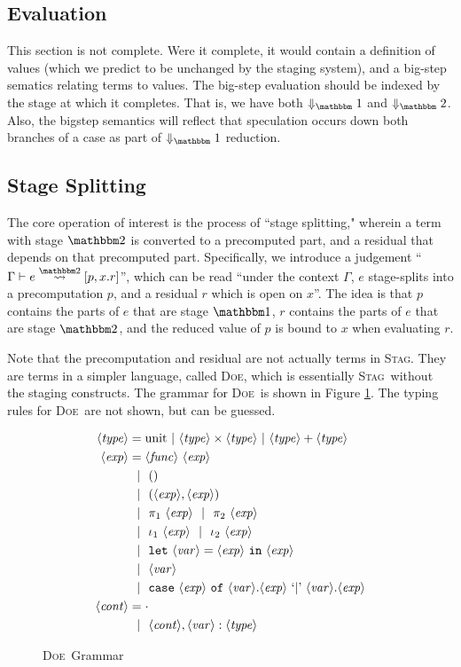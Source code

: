 \documentclass[11pt]{article}
\newcommand {\type} {\langle\mathit{type}\rangle}
\newcommand {\expr} {\langle\mathit{exp}\rangle}
\newcommand {\var} {\langle\mathit{var}\rangle}
\newcommand {\context} {\langle\mathit{cont}\rangle}
\newcommand {\gbar} {~~|~~}
\newcommand {\bbone} {\mathbbm 1}
\newcommand {\bbtwo} {\mathbbm 2}
\newcommand {\letin} [3] {{\tt let}~{#1} = {#2}~{\tt in}~{#3}}
\newcommand {\splits} {\overset{\bbtwo}\rightsquigarrow}
\newcommand {\wstage} {\textsc{Stag}}
\newcommand {\wostage} {\textsc{Doe}}
\begin{document}
\subsection{Evaluation}
This section is not complete.  Were it complete, it would contain a definition of values (which we predict to be unchanged by the staging system), and a big-step sematics relating terms to values.  The big-step evaluation should be indexed by the stage at which it completes.  That is, we have both $\Downarrow_\bbone$ and $\Downarrow_\bbtwo$.  Also, the bigstep semantics will reflect that speculation occurs down both branches of a case as part of  $\Downarrow_\bbone$ reduction.

\subsection{Stage Splitting}

The core operation of interest is the process of ``stage splitting," wherein a term with stage $\bbtwo$ is converted to a precomputed part, and a residual that depends on that precomputed part.  Specifically, we introduce a judgement ``$\Gamma \vdash e \splits [p,x.r]$'', which can be read ``under the context $\Gamma$, $e$ stage-splits into a precomputation $p$, and a residual $r$ which is open on $x$''.  The idea is that $p$ contains the parts of $e$ that are stage $\bbone$, $r$ contains the parts of $e$ that are stage $\bbtwo$, and the reduced value of $p$ is bound to $x$ when evaluating $r$. 

Note that the precomputation and residual are not actually terms in \wstage.  They are terms in a simpler language, called \wostage, which is essentially \wstage~without the staging constructs.  The grammar for \wostage~is shown in Figure \ref{fig:gram2}.  The typing rules for \wostage~are not shown, but can be guessed.

\begin{figure}
\caption{\wostage~Grammar}
\label{fig:gram2}
\centering
\begin{align*}
\type &= \text{unit}~|~\type \times \type~|~\type + \type \\
\expr &= \langle\mathit{func}\rangle~\expr \\
&\gbar () \\
&\gbar (\expr, \expr) \\
&\gbar \pi_1~\expr 
\gbar \pi_2~\expr \\
&\gbar \iota_1~\expr 
\gbar \iota_2~\expr \\
&\gbar \letin {\var}{\expr}{\expr} \\
&\gbar \var \\
&\gbar {\tt case}~\expr~{\tt of}~\var.\expr~`{\tt |}\text{'}~\var.\expr \\
\context &= \cdot \\
&\gbar \context, \var : \type
\end{align*}
\end{figure}
\end{document}
